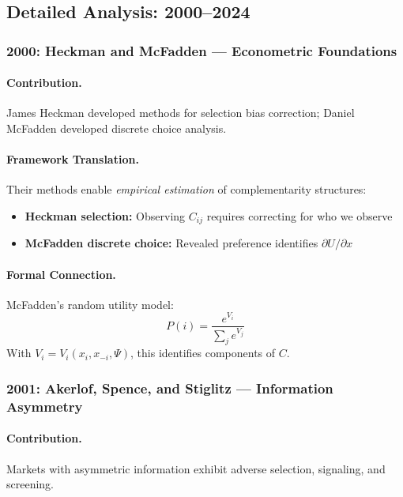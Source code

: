 \subsection{Detailed Analysis: 2000--2024}

\subsubsection{2000: Heckman and McFadden --- Econometric Foundations}

\paragraph{Contribution.}
James Heckman developed methods for selection bias correction;
Daniel McFadden developed discrete choice analysis.

\paragraph{Framework Translation.}
Their methods enable \emph{empirical estimation} of complementarity structures:
\begin{itemize}
  \item \textbf{Heckman selection:} Observing $C_{ij}$ requires correcting for who we observe
  \item \textbf{McFadden discrete choice:} Revealed preference identifies $\partial U / \partial x$
\end{itemize}

\paragraph{Formal Connection.}
McFadden's random utility model:
\begin{equation}
  P(i) = \frac{e^{V_i}}{\sum_j e^{V_j}}
\end{equation}
With $V_i = V_i(x_i, x_{-i}, \Psi)$, this identifies components of $C$.

\subsubsection{2001: Akerlof, Spence, and Stiglitz --- Information Asymmetry}

\paragraph{Contribution.}
Markets with asymmetric information exhibit adverse selection, signaling, and screening.

